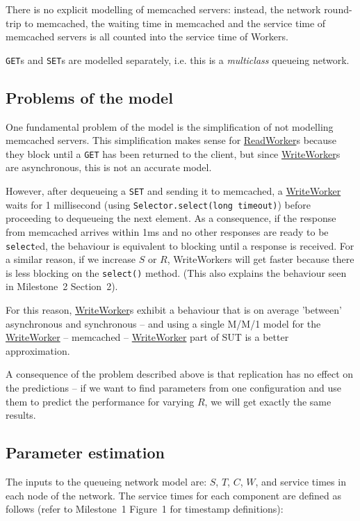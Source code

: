 \documentclass[11pt]{article}
\newcommand{\get}[0]{\texttt{GET}}
\newcommand{\set}[0]{\texttt{SET}}
\newcommand{\linkmain}[1]{\href{https://gitlab.inf.ethz.ch/pungast/asl-fall16-project/blob/master/src/main/java/asl/#1.java}{#1}}
\begin{document}
There is no explicit modelling of memcached servers: instead, the network round-trip to memcached, the waiting time in memcached and the service time of memcached servers is all counted into the service time of Workers.

\get{}s and \set{}s are modelled separately, i.e. this is a \emph{multiclass} queueing network.

\subsection{Problems of the model}
\label{sec:part3:problems}

One fundamental problem of the model is the simplification of not modelling memcached servers. This simplification makes sense for \linkmain{ReadWorker}s because they block until a \get{} has been returned to the client, but since \linkmain{WriteWorker}s are asynchronous, this is not an accurate model.

However, after dequeueing a \set{} and sending it to memcached, a \linkmain{WriteWorker} waits for 1 millisecond (using \texttt{Selector.select(long timeout)}) before proceeding to dequeueing the next element. As a consequence, if the response from memcached arrives within 1ms and no other responses are ready to be \texttt{select}ed, the behaviour is equivalent to blocking until a response is received. For a similar reason, if we increase $S$ or $R$, WriteWorkers will get faster because there is less blocking on the \texttt{select()} method. (This also explains the behaviour seen in Milestone~2 Section~2).

For this reason, \linkmain{WriteWorker}s exhibit a behaviour that is on average 'between' asynchronous and synchronous -- and using a single M/M/1 model for the \linkmain{WriteWorker} -- memcached -- \linkmain{WriteWorker} part of SUT is a better approximation.

A consequence of the problem described above is that replication has no effect on the predictions -- if we want to find parameters from one configuration and use them to predict the performance for varying $R$, we will get exactly the same results.


\subsection{Parameter estimation}

The inputs to the queueing network model are: $S$, $T$, $C$, $W$, and service times in each node of the network. The service times for each component are defined as follows (refer to Milestone~1 Figure~1 for timestamp definitions):
\end{document}
